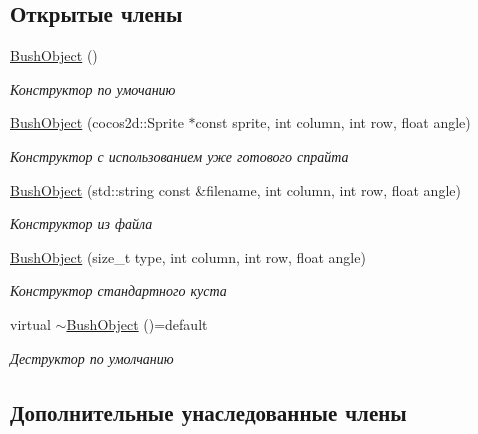 \subsection*{Открытые члены}
\begin{DoxyCompactItemize}
\item 
\mbox{\label{classrtm_1_1_bush_object_af4d581df3386bb72e85431d52d6bc271}} 
\hyperlink{classrtm_1_1_bush_object_af4d581df3386bb72e85431d52d6bc271}{Bush\+Object} ()
\begin{DoxyCompactList}\small\item\em Конструктор по умочанию \end{DoxyCompactList}\item 
\hyperlink{classrtm_1_1_bush_object_a917899e0677ca029936536e389b2a947}{Bush\+Object} (cocos2d\+::\+Sprite $\ast$const sprite, int column, int row, float angle)
\begin{DoxyCompactList}\small\item\em Конструктор с использованием уже готового спрайта \end{DoxyCompactList}\item 
\hyperlink{classrtm_1_1_bush_object_ad0ba65e5d0023bc7b152690186fe96d8}{Bush\+Object} (std\+::string const \&filename, int column, int row, float angle)
\begin{DoxyCompactList}\small\item\em Конструктор из файла \end{DoxyCompactList}\item 
\hyperlink{classrtm_1_1_bush_object_a3d5c2f590082af7c0238bdf84bcaa4b2}{Bush\+Object} (size\+\_\+t type, int column, int row, float angle)
\begin{DoxyCompactList}\small\item\em Конструктор стандартного куста \end{DoxyCompactList}\item 
\mbox{\label{classrtm_1_1_bush_object_ad0bdc84786e3b91fbe2fdf50487e6e9a}} 
virtual \hyperlink{classrtm_1_1_bush_object_ad0bdc84786e3b91fbe2fdf50487e6e9a}{$\sim$\+Bush\+Object} ()=default
\begin{DoxyCompactList}\small\item\em Деструктор по умолчанию \end{DoxyCompactList}\end{DoxyCompactItemize}
\subsection*{Дополнительные унаследованные члены}


